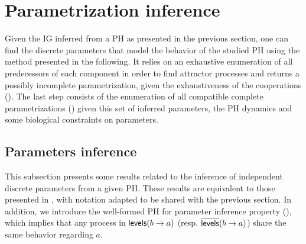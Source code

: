 \section{Parametrization inference}\label{sec:infer-K}


Given the IG inferred from a PH as presented in the previous section, one can find the discrete parameters
that model the behavior of the studied PH using the method presented in the following.
It relies on an exhaustive enumeration of all predecessors of each component in order to find attractor processes
and returns a possibly incomplete parametrization, given the exhaustiveness of the cooperations ().
The last step consists of the enumeration of all compatible complete parametrizations () given this
set of inferred parameters, the PH dynamics and some biological constraints on parameters.



\subsection{Parameters inference}\label{ssec:infer-K}

This subsection presents some results related to the inference of independent discrete parameters from a given PH.
These results are equivalent to those presented in \cite{PMR10-TCSB}, with notation adapted to be shared with the previous section.
In addition, we introduce the well-formed PH for parameter inference property (),
which implies that %
any process in $\mathsf{levels}(b\rightarrow a)$ (resp. $\overline{\mathsf{levels}}(b\rightarrow a)$) share the same behavior
regarding $a$.


